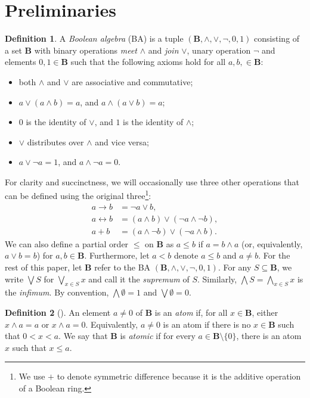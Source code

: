 \documentclass{article}
\theoremstyle{definition}
\newtheorem{definition}{Definition}
\theoremstyle{remark}
\begin{document}
\section{Preliminaries}

\begin{definition} \label{def:ba}
  A \emph{Boolean algebra} (BA) is a tuple $(\mathbf{B}, \land, \lor, \neg, 0,
  1)$ consisting of a set $\mathbf{B}$ with binary operations \emph{meet}
  $\land$ and \emph{join} $\lor$, unary operation $\neg$ and elements $0, 1 \in
  \mathbf{B}$ such that the following axioms hold for all $a, b, \in
  \mathbf{B}$:
  \begin{itemize}
  \item both $\land$ and $\lor$ are associative and commutative;
  \item $a \lor (a \land b) = a$, and $a \land (a \lor b) = a$;
  \item $0$ is the identity of $\lor$, and $1$ is the identity of $\land$;
  \item $\lor$ distributes over $\land$ and vice versa;
  \item $a \lor \neg a = 1$, and $a \land \neg a = 0$.
  \end{itemize}
\end{definition}

For clarity and succinctness, we will occasionally use three other operations
that can be defined using the original three\footnote{We use $+$ to denote
  symmetric difference because it is the additive operation of a Boolean ring.}:
\begin{align*}
  a \to b &= \neg a \lor b, \\
  a \leftrightarrow b &= (a \land b) \lor (\neg a \land \neg b), \\
  a + b &= (a \land \neg b) \lor (\neg a \land b).
\end{align*}
We can also define a partial order $\le$ on $\mathbf{B}$ as $a \le b$ if $a = b
\land a$ (or, equivalently, $a \lor b = b$) for $a, b \in \mathbf{B}$.
Furthermore, let $a < b$ denote $a \le b$ and $a \ne b$. For the rest of this
paper, let $\mathbf{B}$ refer to the BA $(\mathbf{B}, \land, \lor, \neg, 0, 1)$.
For any $S \subseteq \mathbf{B}$, we write $\bigvee S$ for $\bigvee_{x \in S} x$
and call it the \emph{supremum} of $S$. Similarly, $\bigwedge S = \bigwedge_{x
  \in S} x$ is the \emph{infimum}. By convention, $\bigwedge \emptyset = 1$ and
$\bigvee \emptyset = 0$.

\begin{definition}[\cite{DBLP:books/daglib/0090259,levasseur2012applied}]
  An element $a \ne 0$ of $\mathbf{B}$ is an \emph{atom} if, for all $x \in
  \mathbf{B}$, either $x \land a = a$ or $x \land a = 0$. Equivalently, $a \ne
  0$ is an atom if there is no $x \in \mathbf{B}$ such that $0 < x < a$. We say
  that $\mathbf{B}$ is \emph{atomic} if for every $a \in \mathbf{B} \setminus \{0
  \}$, there is an atom $x$ such that $x \le a$.
\end{definition}
\end{document}
